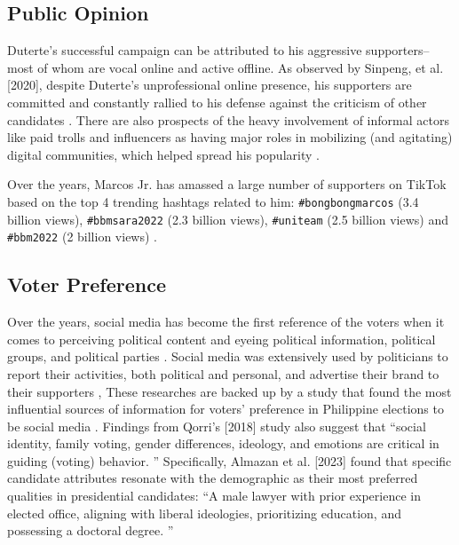 \subsection{Public Opinion}
Duterte’s successful campaign can be attributed to his aggressive supporters– most of whom are vocal online and active offline. As observed by Sinpeng, et al. [2020], despite Duterte’s unprofessional online presence, his supporters are committed and constantly rallied to his defense against the criticism of other candidates \cite{RRL_Sinpeng-2020}. There are also prospects of the heavy involvement of informal actors like paid trolls and influencers as having major roles in mobilizing (and agitating) digital communities, which helped spread his popularity \cite{RRL_Sinpeng-2020}.

Over the years, Marcos Jr. has amassed a large number of supporters on TikTok based on the top 4 trending hashtags related to him: \texttt{\#bongbongmarcos} (3.4 billion views), \texttt{\#bbmsara2022} (2.3 billion views), \texttt{\#uniteam} (2.5 billion views) and \texttt{\#bbm2022} (2 billion views) \cite{RRL_Mendoza-2022}.

\subsection{Voter Preference}
Over the years, social media has become the first reference of the voters when it comes to perceiving political content and eyeing political information, political groups, and political parties \cite{RRL_Campanero-2021}. Social media was extensively used by politicians to report their activities, both political and personal, and advertise their brand to their supporters \cite{RRL_Demillo-2023},  These researches are backed up by a study that found the most influential sources of information for voters’ preference in Philippine elections to be social media \cite{RRL_Almazan-2023}. Findings from Qorri’s [2018] study also suggest that “social identity, family voting, gender differences, ideology, and emotions are critical in guiding (voting) behavior. \cite{RRL_Qorri-2018}” Specifically, Almazan et al. [2023] found that specific candidate attributes resonate with the demographic as their most preferred qualities in presidential candidates: “A male lawyer with prior experience in elected office, aligning with liberal ideologies, prioritizing education, and possessing a doctoral degree. \cite{RRL_Almazan-2023}”